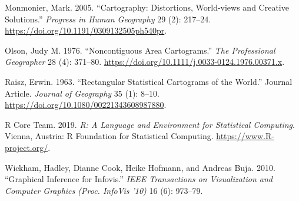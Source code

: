 \documentclass[conference,final,]{IEEEtran}
\begin{document}
\leavevmode\hypertarget{ref-CDWCS}{}%
Monmonier, Mark. 2005. ``Cartography: Distortions, World-views and Creative Solutions.'' \emph{Progress in Human Geography} 29 (2): 217--24. \url{https://doi.org/10.1191/0309132505ph540pr}.

\leavevmode\hypertarget{ref-NAC}{}%
Olson, Judy M. 1976. ``Noncontiguous Area Cartograms.'' \emph{The Professional Geographer} 28 (4): 371--80. \url{https://doi.org/10.1111/j.0033-0124.1976.00371.x}.

\leavevmode\hypertarget{ref-RSCW}{}%
Raisz, Erwin. 1963. ``Rectangular Statistical Cartograms of the World.'' Journal Article. \emph{Journal of Geography} 35 (1): 8--10. \url{https://doi.org/10.1080/00221343608987880}.

\leavevmode\hypertarget{ref-RCore}{}%
R Core Team. 2019. \emph{R: A Language and Environment for Statistical Computing}. Vienna, Austria: R Foundation for Statistical Computing. \url{https://www.R-project.org/}.

\leavevmode\hypertarget{ref-GIIV}{}%
Wickham, Hadley, Dianne Cook, Heike Hofmann, and Andreas Buja. 2010. ``Graphical Inference for Infovis.'' \emph{IEEE Transactions on Visualization and Computer Graphics (Proc. InfoVis '10)} 16 (6): 973--79.
\end{document}
